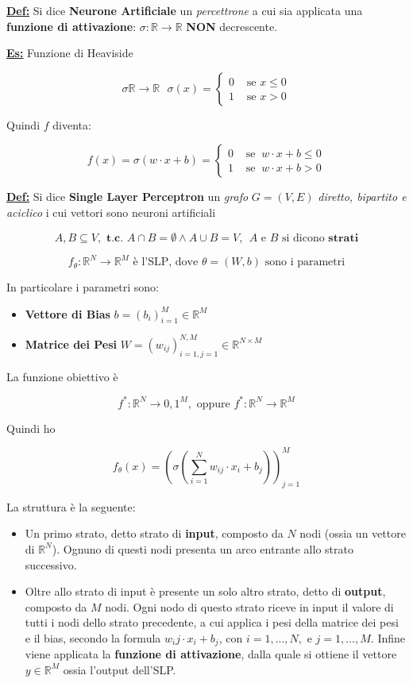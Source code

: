 \documentclass[a4paper,12pt]{article}
\newcommand{\definizione}{\noindent\textbf{\underline{Def:}} }
\newcommand{\esempio}{\noindent\textbf{\underline{Es:}} }
\begin{document}
	\definizione Si dice \textbf{Neurone Artificiale} un \textit{percettrone} a cui sia applicata una \textbf{funzione di attivazione}: $ \sigma : \mathbb{R} \rightarrow \mathbb{R}$ \textbf{NON} decrescente.

	\esempio Funzione di Heaviside

	\[
	\sigma \mathbb{R} \rightarrow \mathbb{R} \ \ \ \sigma(x) = \begin{cases}
		0 & \text{ se } x \leq 0 \\
		1 & \text{ se } x > 0
	\end{cases}
	\]

	Quindi $f$ diventa:

	\[
	f(x) = \sigma(w \cdot x + b) = \begin{cases}
		0 & \text{ se } \ w \cdot x + b \leq 0 \\
		1 & \text{ se } \ w \cdot x + b > 0
	\end{cases}
	\]

	\definizione Si dice \textbf{Single Layer Perceptron} un \textit{grafo} $G = (V, E)$ \textit{diretto, bipartito e aciclico} i cui vettori sono neuroni artificiali

	\[
	A,B \subseteq V, \textbf{ t.c. } A \cap B = \emptyset \land A \cup B = V, \ \ A \text{ e } B \text{ si dicono } \textbf{strati}
 	\]

	\[
	f_\theta : \mathbb{R}^N \rightarrow \mathbb{R}^M \text{ è l'SLP, dove } \theta = (W, b) \text{ sono i parametri}
	\]

	In particolare i parametri sono:
	\begin{itemize}
		\item \textbf{Vettore di Bias} $ b = (b_i)_{i = 1}^M \in \mathbb{R}^M$
		\item \textbf{Matrice dei Pesi} $ W = (w_{ij})_{i=1, j=1}^{N,M} \in \mathbb{R}^{N \times M}$
	\end{itemize}

	La funzione obiettivo è

	\[
	f^* : \mathbb{R}^N \rightarrow {0,1}^M, \text{ oppure } f^* : \mathbb{R}^N \rightarrow \mathbb{R}^M
	\]

	Quindi ho

	\[
	f_\theta(x) =( \sigma (\sum_{i=1}^{N} w_{ij} \cdot x_i + b_j))_{j=1}^M
	\]

	La struttura è la seguente:
	\begin{itemize}
		\item Un primo strato, detto strato di \textbf{input}, composto da $N$ nodi (ossia un vettore di $\mathbb{R}^N$). Ognuno di questi nodi presenta un arco entrante allo strato successivo.
		\item Oltre allo strato di input è presente un solo altro strato, detto di \textbf{output}, composto da $M$ nodi. Ogni nodo di questo strato riceve in input il valore di tutti i nodi dello strato precedente, a cui applica i pesi della matrice dei pesi e il bias, secondo la formula $w_ij \cdot x_i + b_j$, con $i = 1,...,N, \text{ e } j = 1,...,M $. Infine viene applicata la \textbf{funzione di attivazione}, dalla quale si ottiene il vettore $y \in \mathbb{R}^M$ ossia l'output dell'SLP.
	\end{itemize}
\end{document}
